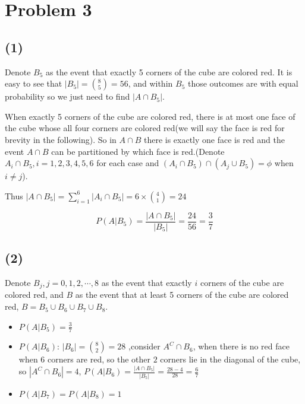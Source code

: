 \documentclass{article}
\begin{document}
\section{Problem 3}

\subsection{(1)}

Denote $B_5$ as the event that exactly 5 corners of the cube are colored red. It is easy to see that $|B_5| = \binom{8}{5} = 56$, and within $B_5$ those outcomes are with equal probability so we just need to find $|A \cap B_5|$.

When exactly 5 corners of the cube are colored red, there is at most one face of the cube whose all four corners are colored red(we will say the face is red for brevity in the following). So in $A \cap B$ there is exactly one face is red and the event $A \cap B$ can be partitioned by which face is red.(Denote $A_i\cap B_5, i =1,2,3,4,5,6$ for each case and $(A_i\cap B_5) \cap (A_j\cup B_5) = \phi$ when $i\neq j$).

Thus $|A \cap B_5| = \sum_{i=1}^6 |A_i\cap B_5| = 6\times \binom{4}{1} = 24$ 

\begin{equation}
    P(A|B_5) = \frac{|A\cap B_5|}{|B_5|} = \frac{24}{56} = \frac {3}{7}
\end{equation}

\subsection{(2)}

Denote $B_j, j = 0,1,2,\cdots,8$ as the event that exactly $i$ corners of the cube are colored red, and $B$ as the event that at least 5 corners of the cube are colored red, $B = B_5\cup B_6\cup B_7 \cup B_8 $.

\begin{itemize}
    \item $P(A|B_5) = \frac 3 7 $
    \item $P(A | B_6)$: $|B_6| = \binom{8}{2} = 28$ ,consider $A^C \cap B_6$, when there is no red face when 6 corners are red, so the other $2$ corners lie in the diagonal of the cube, so  $|A^C \cap B_6|=4$, $P(A|B_6) = \frac{|A\cap B_5|}{|B_5|} = \frac{28-4}{28} = \frac {6}{7}$
    \item $P(A|B_7) = P(A|B_8) = 1$
\end{itemize}
\end{document}
